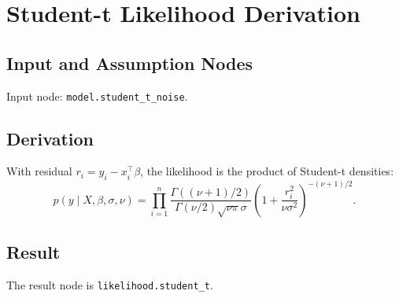 \section{Student-t Likelihood Derivation}
\label{deriv:student-t-likelihood}

\subsection{Input and Assumption Nodes}
Input node: \texttt{model.student\_t\_noise}.

\subsection{Derivation}
With residual \(r_i=y_i-x_i^\top\beta\), the likelihood is the product of Student-t densities:
\[
  p(y\mid X,\beta,\sigma,\nu)
  =
  \prod_{i=1}^n
  \frac{\Gamma((\nu+1)/2)}{\Gamma(\nu/2)\sqrt{\nu\pi}\sigma}
  \left(1+\frac{r_i^2}{\nu\sigma^2}\right)^{-(\nu+1)/2}.
\]

\subsection{Result}
The result node is \texttt{likelihood.student\_t}.
